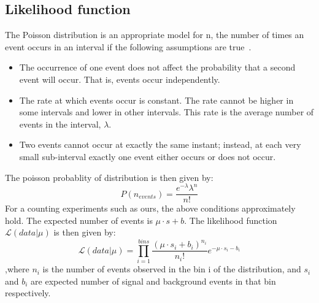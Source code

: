 \subsection{Likelihood function}
The Poisson distribution is an appropriate model for n, the number of times an event occurs in an interval if the following assumptions are true~\cite{poisson_wiki}.
\begin{itemize}
\item The occurrence of one event does not affect the probability that a second event will occur. That is, events occur independently.
\item The rate at which events occur is constant. The rate cannot be higher in some intervals and lower in other intervals. This rate is the average number of events in the interval, $\lambda$.
\item Two events cannot occur at exactly the same instant; instead, at each very small sub-interval exactly one event either occurs or does not occur.
\end{itemize}
The poisson probablity of distribution is then given by:
\begin{equation}
  P(n_{events})=\frac{e^{-\lambda}\lambda^{n}}{n!}
\end{equation}
For a counting experiments such as ours, the above conditions approximately hold. The expected number of events is $\mu\cdot s + b$. The likelihood function $\mathcal{L}(data|\mu)$ is then given by:
\begin{equation}
  \mathcal{L}(data|\mu)=\prod_{i=1}^{bins}\frac{(\mu\cdot s_i + b_i)^{n_i}}{n_{i}!}e^{-\mu\cdot s_i - b_i}
\end{equation}
,where $n_i$ is the number of events observed in the bin i of the distribution, and $s_i$ and $b_i$ are expected number of signal and background events in that bin respectively.


